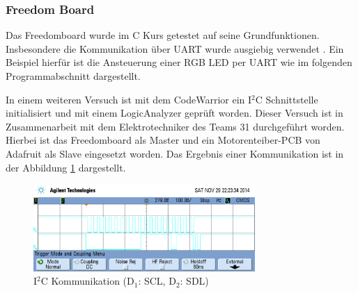 \subsubsection{Freedom Board}
Das Freedomboard wurde im C Kurs getestet auf seine Grundfunktionen.
Insbesondere die Kommunikation über UART wurde ausgiebig verwendet
\cite{ninuxC}. Ein Beispiel hierfür ist die Ansteuerung einer RGB LED
per UART wie im folgenden Programmabschnitt dargestellt.



In einem weiteren Versuch ist mit dem CodeWarrior ein I$^2$C Schnittstelle
initialisiert und mit einem LogicAnalyzer geprüft worden. Dieser Versuch ist
in Zusammenarbeit mit dem Elektrotechniker des Teams 31 durchgeführt worden.
Hierbei ist das Freedomboard als Master und ein Motorenteiber-PCB von
Adafruit als Slave eingesetzt worden. Das Ergebnis einer Kommunikation ist
in der Abbildung \ref{fig:frdm-i2c} dargestellt.

\begin{figure}[h!]
	\centering
	\includegraphics[width=0.75\textwidth]{../../fig/frdm-i2c_crop.pdf}
	\caption{I$^2$C Kommunikation (D$_1$: SCL, D$_2$: SDL)}
	\label{fig:frdm-i2c}
\end{figure}
